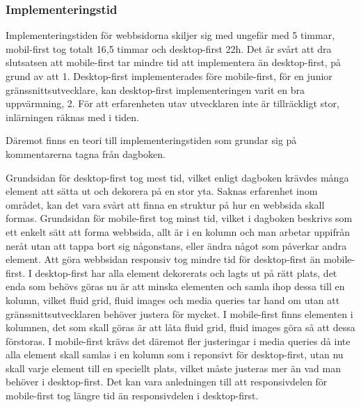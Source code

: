 \documentclass[11pt]{article}
\begin{document}
\subsubsection{Implementeringstid}
Implementeringstiden för webbsidorna skiljer sig med ungefär med 5 timmar, mobil-first tog totalt 16,5 timmar och desktop-first 22h. Det är svårt att dra slutsatsen att mobile-first tar mindre tid att implementera än desktop-first, på grund av att 1. Desktop-first implementerades före mobile-first, för en junior gränssnittsutvecklare, kan desktop-first implementeringen varit en bra uppvärmning, 2. För att erfarenheten utav utvecklaren inte är tillräckligt stor, inlärningen räknas med i tiden.

Däremot finns en teori till implementeringstiden som grundar sig på kommentarerna tagna från dagboken.

Grundsidan för desktop-first tog mest tid, vilket enligt dagboken krävdes många element att sätta ut och dekorera på en stor yta. Saknas erfarenhet inom området, kan det vara svårt att finna en struktur på hur en webbsida skall formas. Grundsidan för mobile-first tog minst tid, vilket i dagboken beskrivs som ett enkelt sätt att forma webbsida, allt är i en kolumn och man arbetar uppifrån neråt utan att tappa bort sig någonstans, eller ändra något som påverkar andra element. Att göra webbsidan responsiv tog mindre tid för desktop-first än mobile-first. I desktop-first har alla element dekorerats och lagts ut på rätt plats, det enda som behövs göras nu är att minska elementen och samla ihop dessa till en kolumn, vilket fluid grid, fluid images och media queries tar hand om utan att gränssnittsutvecklaren behöver justera för mycket. I mobile-first finns elementen i kolumnen, det som skall göras är att låta fluid grid, fluid images göra så att dessa förstoras. I mobile-first krävs det däremot fler justeringar i media queries då inte alla element skall samlas i en kolumn som i reponsivt för desktop-first, utan nu skall varje element till en speciellt plats, vilket måste justeras mer än vad man behöver i desktop-first. Det kan vara anledningen till att responsivdelen för mobile-first tog längre tid än responsivdelen i desktop-first.
\end{document}
